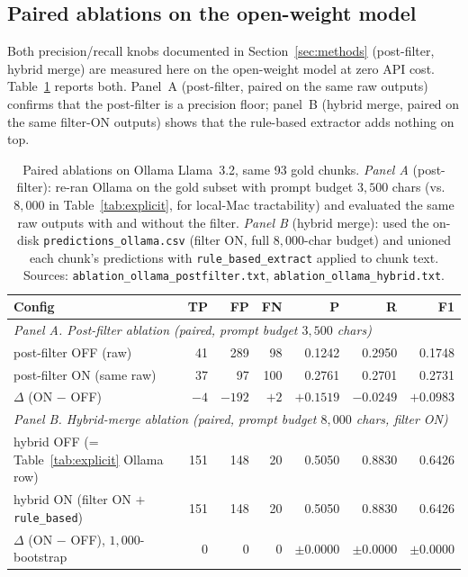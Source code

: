 \documentclass{article}
\begin{document}
\subsection{Paired ablations on the open-weight model}
Both precision/recall knobs documented in Section~\ref{sec:methods} (post-filter, hybrid merge) are measured here on the open-weight model at zero API cost. Table~\ref{tab:ollama-ablation} reports both. Panel~A (post-filter, paired on the same raw outputs) confirms that the post-filter is a precision floor; panel~B (hybrid merge, paired on the same filter-ON outputs) shows that the rule-based extractor adds nothing on top.

\begin{table}[h]
\centering
\caption{Paired ablations on Ollama Llama~3.2, same 93 gold chunks. \emph{Panel A} (post-filter): re-ran Ollama on the gold subset with prompt budget $3{,}500$ chars (vs.\ $8{,}000$ in Table~\ref{tab:explicit}, for local-Mac tractability) and evaluated the same raw outputs with and without the filter. \emph{Panel B} (hybrid merge): used the on-disk \texttt{predictions\_ollama.csv} (filter ON, full $8{,}000$-char budget) and unioned each chunk's predictions with \texttt{rule\_based\_extract} applied to chunk text. Sources: \texttt{ablation\_ollama\_postfilter.txt}, \texttt{ablation\_ollama\_hybrid.txt}.}
\label{tab:ollama-ablation}
\begin{tabular}{lrrrrrr}
\toprule
Config & TP & FP & FN & P & R & F1 \\
\midrule
\multicolumn{7}{l}{\textit{Panel A. Post-filter ablation (paired, prompt budget $3{,}500$ chars)}} \\
post-filter OFF (raw)              & 41  & 289 &  98 & 0.1242 & 0.2950 & 0.1748 \\
post-filter ON  (same raw)         & 37  &  97 & 100 & 0.2761 & 0.2701 & 0.2731 \\
$\Delta$ (ON $-$ OFF)              & $-4$ & $-192$ & $+2$ & $+0.1519$ & $-0.0249$ & $+0.0983$ \\
\midrule
\multicolumn{7}{l}{\textit{Panel B. Hybrid-merge ablation (paired, prompt budget $8{,}000$ chars, filter ON)}} \\
hybrid OFF (= Table~\ref{tab:explicit} Ollama row) & 151 & 148 & 20 & 0.5050 & 0.8830 & 0.6426 \\
hybrid ON  (filter ON $+$ \texttt{rule\_based})    & 151 & 148 & 20 & 0.5050 & 0.8830 & 0.6426 \\
$\Delta$ (ON $-$ OFF), $1{,}000$-bootstrap         & $0$ & $0$ & $0$ & $\pm 0.0000$ & $\pm 0.0000$ & $\pm 0.0000$ \\
\bottomrule
\end{tabular}
\end{table}
\end{document}
